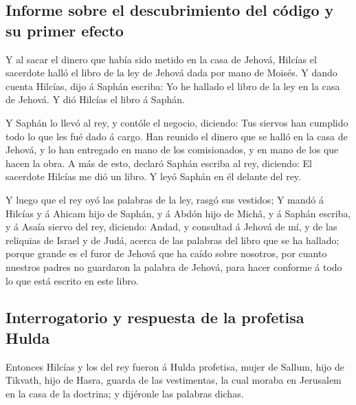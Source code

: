 \hypertarget{informe-sobre-el-descubrimiento-del-cuxf3digo-y-su-primer-efecto}{%
\subsection{Informe sobre el descubrimiento del código y su primer
efecto}\label{informe-sobre-el-descubrimiento-del-cuxf3digo-y-su-primer-efecto}}

 Y al sacar el dinero que había sido metido en la casa de
Jehová, Hilcías el sacerdote halló el libro de la ley de Jehová dada por
mano de Moisés.  Y dando cuenta Hilcías, dijo á Saphán
escriba: Yo he hallado el libro de la ley en la casa de Jehová. Y dió
Hilcías el libro á Saphán.

 Y Saphán lo llevó al rey, y contóle el negocio,
diciendo: Tus siervos han cumplido todo lo que les fué dado á cargo.
 Han reunido el dinero que se halló en la casa de Jehová,
y lo han entregado en mano de los comisionados, y en mano de los que
hacen la obra.  A más de esto, declaró Saphán escriba al
rey, diciendo: El sacerdote Hilcías me dió un libro. Y leyó Saphán en él
delante del rey.

 Y luego que el rey oyó las palabras de la ley, rasgó sus
vestidos;  Y mandó á Hilcías y á Ahicam hijo de Saphán, y
á Abdón hijo de Michâ, y á Saphán escriba, y á Asaía siervo del rey,
diciendo:  Andad, y consultad á Jehová de mí, y de las
reliquias de Israel y de Judá, acerca de las palabras del libro que se
ha hallado; porque grande es el furor de Jehová que ha caído sobre
nosotros, por cuanto nuestros padres no guardaron la palabra de Jehová,
para hacer conforme á todo lo que está escrito en este libro.

\hypertarget{interrogatorio-y-respuesta-de-la-profetisa-hulda}{%
\subsection{Interrogatorio y respuesta de la profetisa
Hulda}\label{interrogatorio-y-respuesta-de-la-profetisa-hulda}}

 Entonces Hilcías y los del rey fueron á Hulda profetisa,
mujer de Sallum, hijo de Tikvath, hijo de Hasra, guarda de las
vestimentas, la cual moraba en Jerusalem en la casa de la doctrina; y
dijéronle las palabras dichas.

